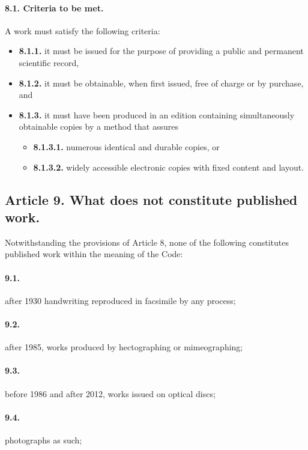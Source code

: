 \paragraph*{8.1. Criteria to be met.} A work must satisfy the following criteria:

\begin{itemize}
    \item \textbf{8.1.1.} it must be issued for the purpose of providing a public and permanent scientific record,
    \item \textbf{8.1.2.} it must be obtainable, when first issued, free of charge or by purchase, and
    \item \textbf{8.1.3.} it must have been produced in an edition containing simultaneously obtainable copies by a method that assures
    \begin{itemize}
        \item \textbf{8.1.3.1.} numerous identical and durable copies, or
        \item \textbf{8.1.3.2.} widely accessible electronic copies with fixed content and layout.
    \end{itemize}
\end{itemize}


\subsection*{Article 9. What does not constitute published work.}
Notwithstanding the provisions of Article 8, none of the following constitutes published work within the meaning of the Code:

\paragraph*{9.1.} after 1930 handwriting reproduced in facsimile by any process;

\paragraph*{9.2.} after 1985, works produced by hectographing or mimeographing;

\paragraph*{9.3.} before 1986 and after 2012, works issued on optical discs;

\paragraph*{9.4.} photographs as such;

